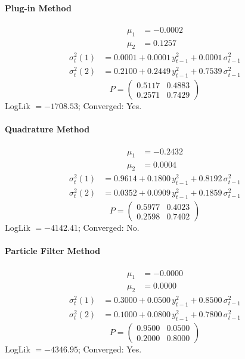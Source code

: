 \documentclass[11pt, a4paper]{article}
\begin{document}
\paragraph{Plug-in Method}
\begin{align}
\mu_{1} &= -0.0002 \\
\mu_{2} &= 0.1257
\end{align}
\begin{align}
\sigma^2_{t}(1) &= 0.0001 + 0.0001\, y_{t-1}^2 + 0.0001\, \sigma^2_{t-1} \\
\sigma^2_{t}(2) &= 0.2100 + 0.2449\, y_{t-1}^2 + 0.7539\, \sigma^2_{t-1}
\end{align}
\begin{equation}
P = \begin{pmatrix} 0.5117 & 0.4883 \\ 0.2571 & 0.7429 \end{pmatrix}
\end{equation}
LogLik $= -1708.53$; Converged: Yes.

\paragraph{Quadrature Method}
\begin{align}
\mu_{1} &= -0.2432 \\
\mu_{2} &= 0.0004
\end{align}
\begin{align}
\sigma^2_{t}(1) &= 0.9614 + 0.1800\, y_{t-1}^2 + 0.8192\, \sigma^2_{t-1} \\
\sigma^2_{t}(2) &= 0.0352 + 0.0909\, y_{t-1}^2 + 0.1859\, \sigma^2_{t-1}
\end{align}
\begin{equation}
P = \begin{pmatrix} 0.5977 & 0.4023 \\ 0.2598 & 0.7402 \end{pmatrix}
\end{equation}
LogLik $= -4142.41$; Converged: No.

\paragraph{Particle Filter Method}
\begin{align}
\mu_{1} &= -0.0000 \\
\mu_{2} &= 0.0000
\end{align}
\begin{align}
\sigma^2_{t}(1) &= 0.3000 + 0.0500\, y_{t-1}^2 + 0.8500\, \sigma^2_{t-1} \\
\sigma^2_{t}(2) &= 0.1000 + 0.0800\, y_{t-1}^2 + 0.7800\, \sigma^2_{t-1}
\end{align}
\begin{equation}
P = \begin{pmatrix} 0.9500 & 0.0500 \\ 0.2000 & 0.8000 \end{pmatrix}
\end{equation}
LogLik $= -4346.95$; Converged: Yes.
\end{document}
